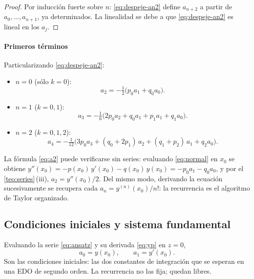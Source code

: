 \begin{proof}
Por inducción fuerte sobre $n$: \eqref{eq:despeje-an2} define $a_{n+2}$ a
partir de $a_0,\dots,a_{n+1}$, ya determinados. La linealidad se debe a que
\eqref{eq:despeje-an2} es lineal en los $a_j$.
\end{proof}



\paragraph{Primeros términos}
Particularizando \eqref{eq:despeje-an2}:
\begin{itemize}
  \item $n=0$ (sólo $k=0$):
        \begin{equation}\label{eq:a2}
          a_2=-\tfrac12\bigl(p_0a_1+q_0a_0\bigr).
        \end{equation}
  \item $n=1$ ($k=0,1$):
        \begin{equation}\label{eq:a3}
          a_3=-\tfrac16\bigl(2p_0a_2+q_0a_1+p_1a_1+q_1a_0\bigr).
        \end{equation}
  \item $n=2$ ($k=0,1,2$):
        \begin{equation}\label{eq:a4}
          a_4=-\tfrac1{12}\bigl(3p_0a_3+(q_0+2p_1)\,a_2+(q_1+p_2)\,a_1+q_2a_0\bigr).
        \end{equation}
\end{itemize}

\begin{observacion}[Comprobación]\label{obs:comprobacion}
La fórmula \eqref{eq:a2} puede verificarse sin series: evaluando
\eqref{eq:normal} en $x_0$ se obtiene
$y''(x_0)=-p(x_0)\,y'(x_0)-q(x_0)\,y(x_0)=-p_0a_1-q_0a_0$, y por el
\cref{teo:series}\,(iii), $a_2=y''(x_0)/2$. Del mismo modo, derivando la
ecuación sucesivamente se recupera cada $a_n=y^{(n)}(x_0)/n!$: la
recurrencia es el algoritmo de Taylor organizado.
\end{observacion}

\subsection{Condiciones iniciales y sistema fundamental}\label{sec:fundamental}
Evaluando la serie \eqref{eq:ansatz} y su derivada \eqref{eq:yp} en $z=0$,
\begin{equation}\label{eq:a0a1}
  a_0=y(x_0),\qquad a_1=y'(x_0).
\end{equation}
Son las condiciones iniciales: las dos constantes de integración que se
esperan en una EDO de segundo orden. La recurrencia no las fija; quedan
libres.

